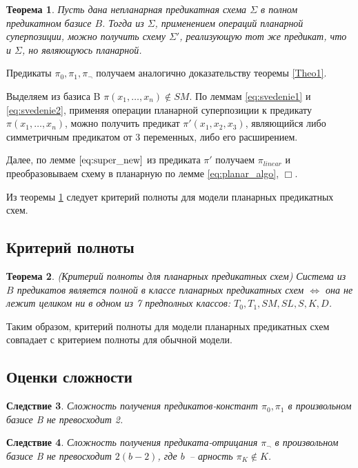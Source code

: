 \documentclass[12pt]{extarticle}
\newtheorem{theorem}{Теорема}[section]
\newtheorem{corollary}[theorem]{Следствие}
\newenvironment{proof}[1][Доказательство.]{\begin{trivlist}
\item[\hskip \labelsep {\bfseries #1}]}{\end{trivlist}}
\begin{document}
\begin{theorem}
\label{Theo2}
Пусть дана непланарная предикатная схема $\Sigma$ в полном предикатном базисе $B$. 
Тогда из $\Sigma$, применением операций планарной суперпозиции, можно получить схему $\Sigma'$,
реализующую тот же предикат, что и $\Sigma$, но являющуюсь планарной.
\end{theorem}

\begin{proof}
Предикаты $\pi_0, \pi_1, \pi_{\neg}$ получаем аналогично доказательству теоремы \ref{Theo1}.

Выделяем из базиса B $\pi(x_1, \dots, x_n) \notin SM$. По леммам \ref{eq:svedenie1} и \ref{eq:svedenie2}, 
применяя операции планарной суперпозиции к предикату $\pi(x_1, \dots, x_n)$, можно получить 
предикат $\pi'(x_1, x_2, x_3)$, являющийся либо симметричным предикатом от 3 переменных, либо его расширением. 

Далее, по лемме $\ref{eq:super_new}$ из предиката $\pi'$ получаем $\pi_{linear}$ и преобразовываем схему в планарную
по лемме \ref{eq:planar_algo}, $\Box$.
\end{proof}

Из теоремы \ref{Theo2} следует критерий полноты для модели планарных предикатных схем.

\subsection{Критерий полноты}
\begin{theorem}
(Критерий полноты для планарных предикатных схем)
Система из $B$ предикатов является полной в классе планарных предикатных схем $\iff$
она не лежит целиком ни в одном из 7 предполных классов: $T_0, T_1, SM, SL, S, K, D$. 
\end{theorem}

Таким образом, критерий полноты для модели планарных предикатных схем совпадает с критерием полноты для обычной модели.

\subsection{Оценки сложности}

\begin{corollary}
\label{corol:const}
Сложность получения предикатов-констант $\pi_0, \pi_1$ в произвольном базисе B не превосходит 2.
\end{corollary}

\begin{corollary}
\label{corol:negate}
Сложность получения предиката-отрицания $\pi_{\neg}$ в произвольном базисе B не превосходит $2(b-2)$, 
где $b$~-- арность $\pi_K \notin K$.
\end{corollary}
\end{document}
